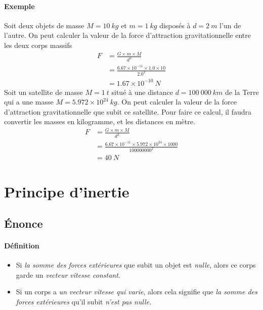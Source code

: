 \paragraph{Exemple} Soit deux objets de masse $M=10~kg$ et $m=1~kg$ disposés à $d=2~m$ l'un de l'autre. On peut calculer la valeur de la force d'attraction gravitationnelle entre les deux corps massifs 
\begin{equation*}
  \begin{aligned}
    F   &= \frac{G \times m \times M}{d^2} \\
	&= \frac{6.67 \times 10^{-11} \times 1.0 \times 10}{2.0^2} \\		
	&= 1.67 \times 10^{-10}~N 
  \end{aligned} 
\end{equation*}
Soit un satellite de masse $M=1~t$ situé à une distance $d=100~000~km$ de la Terre qui a une masse $M=5.972 \times 10^{24}~kg$. On peut calculer la valeur de la force d'attraction gravitationnelle que subit ce satellite. Pour faire ce calcul, il faudra convertir les masses en kilogramme, et les distances en mètre.
\begin{equation*}
  \begin{aligned}
    F   &= \frac{G \times m \times M}{d^2} \\
	&= \frac{6.67 \times 10^{-11} \times 5.972 \times 10^{24} \times 1000}{100000000^2} \\		
	&= 40~N 
  \end{aligned} 
\end{equation*}


\section{Principe d'inertie}
\subsection{Énonce} 
\paragraph{Définition} 
\begin{itemize}
 \item Si \textit{la somme des forces extérieures} que subit un objet est \textit{nulle}, alors ce corps garde un \textit{vecteur vitesse constant}.
 \item Si un corps a \textit{un vecteur vitesse qui varie}, alors cela signifie que \textit{la somme des forces extérieures} qu'il subit \textit{n'est pas nulle}.
\end{itemize}

